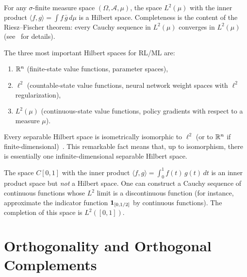 \documentclass[11pt,a4paper]{article}
\begin{document}
\begin{example}
\label{ex:L2_hilbert}
For any $\sigma$-finite measure space $(\Omega, \mathcal{A}, \mu)$, the
space $L^2(\mu)$ with the inner product
$\langle f, g \rangle = \int f\, \bar{g}\, d\mu$ is a Hilbert space.
Completeness is the content of the Riesz--Fischer theorem: every Cauchy
sequence in $L^2(\mu)$ converges in $L^2(\mu)$
(see~\cite{brezis2011} for details).
\end{example}

\begin{keyresult}[title={The Three Fundamental Hilbert Spaces}]
The three most important Hilbert spaces for RL/ML are:
\begin{enumerate}[nosep]
    \item $\mathbb{R}^n$ (finite-state value functions, parameter spaces),
    \item $\ell^2$ (countable-state value functions, neural network weight
          spaces with $\ell^2$ regularization),
    \item $L^2(\mu)$ (continuous-state value functions, policy gradients
          with respect to a measure $\mu$).
\end{enumerate}
Every separable Hilbert space is isometrically isomorphic to $\ell^2$ (or
to $\mathbb{R}^n$ if finite-dimensional)~\cite{conway1990}. This remarkable fact
means that, up to isomorphism, there is essentially one
infinite-dimensional separable Hilbert space.
\end{keyresult}

\begin{warning}[{title={$C[0,1]$ with the $L^2$ Inner Product is Not a Hilbert Space}}]
The space $C[0,1]$ with the inner product
$\langle f, g \rangle = \int_0^1 f(t)\, g(t)\, dt$ is an inner product space
but \emph{not} a Hilbert space. One can construct a Cauchy sequence of
continuous functions whose $L^2$ limit is a discontinuous function (for
instance, approximate the indicator function $\mathbf{1}_{[0,1/2]}$ by
continuous functions). The completion of this space is $L^2([0,1])$.
\end{warning}


\section{Orthogonality and Orthogonal Complements}
\label{sec:orthogonality}
\end{document}
